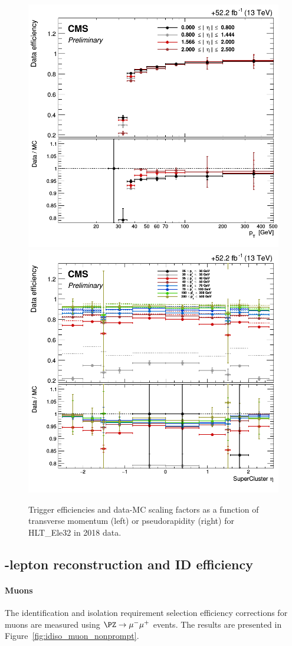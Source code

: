 \begin{figure}[h]
  \centering
  \includegraphics[width=.38\textwidth]{Figures/c6/efficiencies/trigger_electrons/2018/passEle32/leptonSF_SFvspT_passEle32.png}
\hspace{1cm}
  \includegraphics[width=.38\textwidth]{Figures/c6/efficiencies/trigger_electrons/2018/passEle32/leptonSF_SFvseta_passEle32.png}
  \caption{Trigger efficiencies and data-MC scaling factors as a function of transverse momentum (left) or pseudorapidity (right)
    for HLT\_Ele32 in 2018 data. \tom}
  \label{fig:trigger_electrons}
\end{figure}

\subsection{\Displ-lepton reconstruction and ID efficiency} \label{sec:displeptoneff}
\paragraph{Muons}\label{sec:eff_disp_muon}
The identification and isolation requirement selection
efficiency corrections for \displ muons are measured
using $\PZ\to\mu^-\mu^+$ events. The results are presented
in Figure~\ref{fig:idiso_muon_nonprompt}. 

